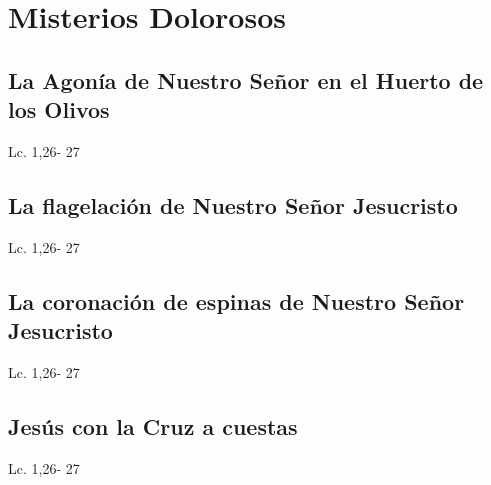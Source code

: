 \documentclass[a4paper,11pt,sans]{article}
\begin{document}
    \newpage
        
  \section*{\hfil Misterios Dolorosos \hfil}
    \subsection*{\hfil La Agonía de Nuestro Señor en el Huerto de los Olivos \hfil}
      \begin{multicols}{2}

      \columnbreak
           
      \end{multicols}
      \begin{center}
        Lc. 1,26- 27           
      \end{center}
    \subsection*{\hfil La flagelación de Nuestro Señor Jesucristo \hfil}
        
      \begin{multicols}{2}

      \columnbreak
           
      \end{multicols}
      \begin{center}
        Lc. 1,26- 27           
      \end{center}
    \subsection*{\hfil La coronación de espinas de Nuestro Señor Jesucristo \hfil}
      \begin{multicols}{2}

      \columnbreak
           
      \end{multicols}
      \begin{center}
         Lc. 1,26- 27           
      \end{center}
    \subsection*{\hfil Jesús con la Cruz a cuestas \hfil}
      \begin{multicols}{2}

      \columnbreak
           
      \end{multicols}
      \begin{center}
        Lc. 1,26- 27           
      \end{center}
\end{document}

